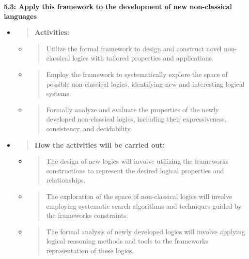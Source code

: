 \textbf{5.3: Apply this framework to the development of new
non-classical languages}

\begin{itemize}
\item
  \begin{quote}
  \textbf{Activities:}
  \end{quote}

  \begin{itemize}
  \item
    \begin{quote}
    Utilize the formal framework to design and construct novel
    non-classical logics with tailored properties and applications.
    \end{quote}
  \item
    \begin{quote}
    Employ the framework to systematically explore the space of possible
    non-classical logics, identifying new and interesting logical
    systems.
    \end{quote}
  \item
    \begin{quote}
    Formally analyze and evaluate the properties of the newly developed
    non-classical logics, including their expressiveness, consistency,
    and decidability.
    \end{quote}
  \end{itemize}
\item
  \begin{quote}
  \textbf{How the activities will be carried out:}
  \end{quote}

  \begin{itemize}
  \item
    \begin{quote}
    The design of new logics will involve utilizing the
    framework\textquotesingle s constructions to represent the desired
    logical properties and relationships.
    \end{quote}
  \item
    \begin{quote}
    The exploration of the space of non-classical logics will involve
    employing systematic search algorithms and techniques guided by the
    framework\textquotesingle s constraints.
    \end{quote}
  \item
    \begin{quote}
    The formal analysis of newly developed logics will involve applying
    logical reasoning methods and tools to the
    framework\textquotesingle s representation of these logics.
    \end{quote}
  \end{itemize}
\end{itemize}

